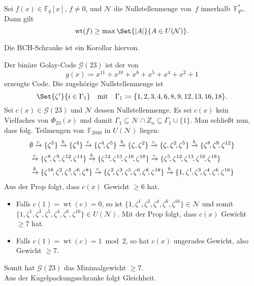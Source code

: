 \documentclass{cheat-sheet}
\newcommand{\F}{\mathbb{F}} %
\DeclareMathOperator{\wt}{wt} %
\newcommand{\Golay}{\mathcal{G}} %
\begin{document}
\begin{prop}
  Sei $f(x) \in \F_q[x]$, $f \neq 0$, und $\mathcal{N}$ die Nullstellenmenge von~$f$ innerhalb~$\F_{q^m}^*$.
  Dann gilt
  \[
    \wt(f) \geq \max \Set{\abs{A}}{A \in U(\mathcal{N})}.
  \]
\end{prop}

\begin{bem}
  Die BCH-Schranke ist ein Korollar hiervon.
\end{bem}

\begin{bsp}
  Der binäre Golay-Code $\Golay(23)$ ist der von
  \[
    g(x) \coloneqq x^{11} + x^{10} + x^6 + x^5 + x^4 + x^2 + 1
  \]
  erzeugte Code.
  Die zugehörige Nullstellenmenge ist
  \[
    \Set{\zeta^i}{i \in \Gamma_1}
    \quad \text{mit} \quad
    \Gamma_1 \coloneqq \{ 1, 2, 3, 4, 6, 8, 9, 12, 13, 16, 18 \}.
  \]
  Sei $c(x) \in \Golay(23)$ und $\mathcal{N}$ dessen Nullstellenmenge.
  Es sei $c(x)$ kein Vielfaches von $\Phi_{23}(x)$ und damit $\Gamma_1 \subseteq \mathcal{N} \cap Z_n \subseteq \Gamma_1 \cup \{ 1 \}$.
  Man schließt nun, dass folg. Teilmengen von~$\F_{2048}$ in $U(\mathcal{N})$ liegen:
  \begin{align*}
    & \emptyset
    \xra{c}
    \{ \zeta^5 \}
    \xra{b}
    \{ \zeta^4 \}
    \xra{c}
    \{ \zeta^4\!, \zeta^5 \}
    \xra{b}
    \{ \zeta, \zeta^2 \}
    \xra{c}
    \{ \zeta, \zeta^2\!, \zeta^5 \}
    \xra{b}
    \{ \zeta^8\!, \zeta^9\!, \zeta^{12} \} \\
    & \xra{c}
    \{ \zeta^8\!, \zeta^9\!, \zeta^{12}\!, \zeta^{14} \}
    \xra{b}
    \{ \zeta^{12}\!, \zeta^{13}\!, \zeta^{16}\!, \zeta^{18} \}
    \xra{c}
    \{ \zeta^5\!, \zeta^{12}\!, \zeta^{13}\!, \zeta^{16}\!, \zeta^{18} \} \\
    & \xra{b}
    \{ \zeta^{18}\!, \zeta^2\!, \zeta^3\!, \zeta^6\!, \zeta^8 \}
    \xra{c}
    \{ \zeta^2\!, \zeta^3\!, \zeta^5\!, \zeta^6\!, \zeta^8\!, \zeta^{18} \}
    \xra{b}
    \{ 1, \zeta^1\!, \zeta^3\!, \zeta^4\!, \zeta^6\!, \zeta^{16} \}
  \end{align*}
  Aus der Prop folgt, dass $c(x)$ Gewicht $\geq 6$ hat.
  \begin{itemize}
    \item Falls $c(1) = \wt(c) = 0$, so ist $\{ 1, \zeta^1, \zeta^3, \zeta^4, \zeta^6, \zeta^{16} \} \in \mathcal{N}$ und somit $\{ 1, \zeta^1, \zeta^3, \zeta^5, \zeta^4, \zeta^6, \zeta^{16} \} \in U(\mathcal{N})$.
    Mit der Prop folgt, dass $c(x)$ Gewicht $\geq 7$ hat.
    \item Falls $c(1) = \wt(c) = 1 \bmod{2}$, so hat $c(x)$ ungerades Gewicht, also Gewicht $\geq 7$.
  \end{itemize}
  Somit hat $\Golay(23)$ das Minimalgewicht $\geq 7$. \\
  Aus der Kugelpackungsschranke folgt Gleichheit.
\end{bsp}
\end{document}
